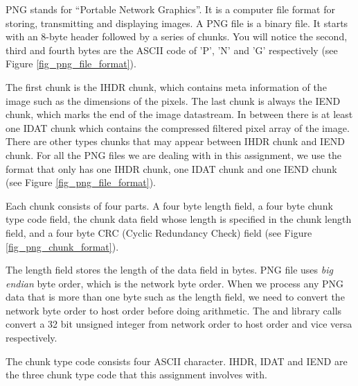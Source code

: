 \begin{figure}[h]  
\centering
{}
\end{figure}

PNG stands for ``Portable Network Graphics''. It is a computer file format for storing, transmitting and displaying images\cite{Roelofs1999PNG}. A PNG file is a binary file. It starts with an 8-byte header followed by a series of chunks. You will notice the second, third and fourth bytes are the ASCII code of 'P', 'N' and 'G' respectively (see Figure \ref{fig_png_file_format}).

The first chunk is the IHDR chunk, which contains meta information of the image such as the dimensions of the pixels. The last chunk is always the IEND chunk, which marks the end of the image datastream. In between there is at least one IDAT chunk which contains the compressed filtered pixel array of the image. There are other types chunks that may appear between IHDR chunk and IEND chunk. For all the PNG files we are dealing with in this assignment, we use the format that only has one IHDR chunk, one IDAT chunk and one IEND chunk (see Figure \ref{fig_png_file_format}).


Each chunk consists of four parts. A four byte length field, a four byte chunk type code field, the chunk data field whose length is specified in the chunk length field, and a four byte CRC (Cyclic Redundancy Check) field (see Figure \ref{fig_png_chunk_format}).

The length field stores the length of the data field in bytes. PNG file uses {\em big endian} byte order, which is the network byte order. When we process any PNG data that is more than one byte such as the length field, we need to convert the network byte order to host order before doing arithmetic. The  and  library calls convert a 32 bit unsigned integer from network order to host order and vice versa respectively.



The chunk type code consists four ASCII character. IHDR, IDAT and IEND are the three chunk type code that this assignment involves with.

